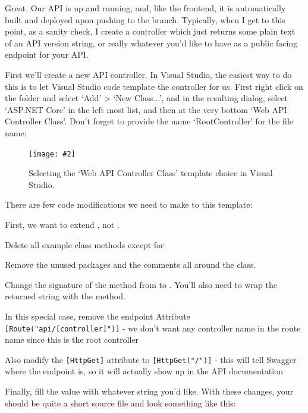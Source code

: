 \documentclass[paper=6in:9in,pagesize=pdftex,headinclude=on,footinclude=on,12pt,twoside]{scrbook}
\newcommand{\standardfigure}[3]{\begin{figure}[H]\begin{center}\texttt{[image: \#2]}\caption{#3}\label{fig:#2}\end{center}\end{figure}}
\begin{document}
Great. Our API is up and running, and, like the frontend, it is automatically built and deployed upon pushing to the  branch. Typically, when I get to this point, as a sanity check, I create a  controller which just returns some plain text of an API version string, or really whatever you'd like to have as a public facing endpoint for your API.


First we'll create a new API controller. In Visual Studio, the easiest way to do this is to let Visual Studio code template the controller for us. First right click on the  folder and select `Add' > `New Class...', and in the resulting dialog, select `ASP.NET Core' in the left most list, and then at the very bottom `Web API Controller Class'. Don't forget to provide the name `RootController' for the file name:

\standardfigure{\textwidth}{backend/web-api-controller}{Selecting the `Web API Controller Class' template choice in Visual Studio.}

There are few code modifications we need to make to this template: 

\begin{arrows}
\item First, we want to extend , not . 
\item Delete all example class methods except for 
\item Remove the unused packages and the comments all around the class.
\item Change the signature of the  method from  to . You'll also need to wrap the returned string with the  method.
\item In this special case, remove the endpoint Attribute \texttt{[Route("api/[controller]")]} - we don't want any controller name in the route name since this is the root controller
\item Also modify the \texttt{[HttpGet]} attribute to \texttt{[HttpGet("/")]} - this will tell Swagger where the endpoint is, so it will actually show up in the API documentation
\end{arrows}

Finally, fill the  value with whatever string you'd like. With these changes, your  should be quite a short source file and look something like this:
\end{document}

